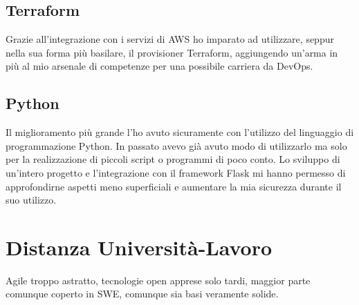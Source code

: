 \subsection{Terraform}
Grazie all'integrazione con i servizi di AWS ho imparato ad utilizzare, seppur nella sua forma più basilare, il provisioner Terraform, aggiungendo un'arma in più al mio arsenale di competenze per una possibile carriera da DevOps.
\subsection{Python}
Il miglioramento più grande l'ho avuto sicuramente con l'utilizzo del linguaggio di programmazione Python. In passato avevo già avuto modo di utilizzarlo ma solo per la realizzazione di piccoli script o programmi di poco conto. Lo sviluppo di un'intero progetto e l'integrazione con il \gls{framework} Flask mi hanno permesso di approfondirne aspetti meno superficiali e aumentare la mia sicurezza durante il suo utilizzo. 
\section{Distanza Università-Lavoro}
Agile troppo astratto, tecnologie open apprese solo tardi, maggior parte comunque coperto in SWE, comunque sia basi veramente solide.
